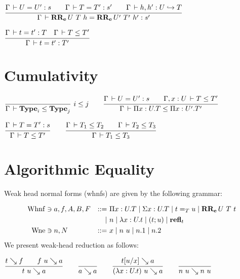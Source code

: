 \documentclass[a4paper,english]{lipics-utf8x}
\begin{document}
  \begin{center}
  \(
    \ru{\Gamma \der U = U' : s \qquad
        \Gamma \der T = T' : s' \qquad
        \Gamma \der h, h' : \emb{U}{T}
      }{\Gamma \der \RRe{U}{T}{h} = \RRe{U'}{T'}{h'} : s'}
  \)
  \end{center}


  \begin{center}
  \(
    \ru{\Gamma \der t = t' : T \quad
        \Gamma \der T \le T'
      }{\Gamma \der t = t' : T'}
  \)
  \end{center}


  \section{Cumulativity}

  \begin{center}
  \(
    \rux{}{\Gamma \der \Type_i \le \Type_j}{i \le j}
    \qquad
    \ru{\Gamma \der U = U' : s \qquad
        \Gamma, x:U \der T \le T'
      }{\Gamma \der \Pi x:U.T \le \Pi x:U'.T'}
  \)
  \end{center}

  \begin{center}
  \(
    \ru{\Gamma \der T = T' : s
      }{\Gamma \der T \le T'}
    \qquad
    \ru{\Gamma \der T_1 \le T_2 \qquad
        \Gamma \der T_2 \le T_3
      }{\Gamma \der T_1 \le T_3}
  \)
  \end{center}

  \section{Algorithmic Equality}


  Weak head normal forms (whnfs) are given by the following grammar:

  \begin{align*}
    \operatorname{Whnf} &\ni a,f,A,B,F &::=~& \Pi x:U.T \mid \Sigma x:U.T \mid t =_T u
                           \mid \operatorname{\mathbf{RR_e}}U\ T\ t \\
        &&\mid~& n \mid \lambda x:U.t \mid (t;u) \mid \operatorname{\mathbf{refl}}_t \\
    \operatorname{Wne}  &\ni n,N &::=~& x \mid n~u \mid n.1 \mid n.2
  \end{align*}
  We present weak-head reduction as follows:

  \begin{center}
  \(
    \ru{t \rew f \qquad
        f~u \rew a
      }{t~u \rew a}
    \qquad
    \ru{}{a \rew a}
    \qquad
    \ru{t[u/x] \rew a
      }{(\lambda x:U.t)~u \rew a}
    \qquad
    \ru{}{n~u \rew n~u}
  \)
  \end{center}
\end{document}
